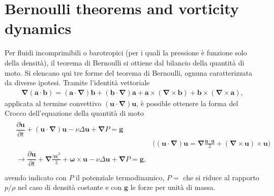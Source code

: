 \documentclass[letterpaper,10pt,italian]{jupyterBook}
\begin{document}
\chapter{Bernoulli theorems and vorticity dynamics}
\label{\detokenize{polimi/fluidmechanics-ita/template/capitoli/05_bernoulli/05teoria:bernoulli-theorems-and-vorticity-dynamics}}\label{\detokenize{polimi/fluidmechanics-ita/template/capitoli/05_bernoulli/05teoria:fluid-mechanics-bernoulli}}\label{\detokenize{polimi/fluidmechanics-ita/template/capitoli/05_bernoulli/05teoria::doc}}
\sphinxAtStartPar
Per fluidi incomprimibili o barotropici (per i quali la pressione è
funzione solo della densità), il teorema di Bernoulli si ottiene dal
bilancio della quantità di moto. Si elencano qui tre forme del teorema
di Bernoulli, ognuna caratterizzata da diverse ipotesi. Tramite
l’identità vettoriale
\begin{equation*}
\begin{split}\mathbf{\nabla} (\mathbf{a} \cdot \mathbf{b}) = (\mathbf{a} \cdot \mathbf{\nabla}) \mathbf{b} +  (\mathbf{b} \cdot \mathbf{\nabla}) \mathbf{a} + \mathbf{a} \times (\mathbf{\nabla} \times \mathbf{b}) + \mathbf{b} \times (\mathbf{\nabla} \times \mathbf{a}),\end{split}
\end{equation*}
\sphinxAtStartPar
applicata al termine convettivo \((\mathbf{u} \cdot \mathbf{\nabla}) \mathbf{u}\), è
possible ottenere la forma del Crocco dell’equazione della quantità di
moto
\begin{equation*}
\begin{split}\label{eqn:bilanci:crocco}
\begin{aligned}
 & \dfrac{\partial \mathbf{u}}{\partial t} + (\mathbf{u} \cdot \mathbf{\nabla}) \mathbf{u} - \nu \Delta \mathbf{u} + \mathbf{\nabla} P = \mathbf{g}  & \\ &  &  \bigg( (\mathbf{u} \cdot \mathbf{\nabla})\mathbf{u} = \mathbf{\nabla} \frac{\mathbf{u} \cdot \mathbf{u}}{2} + (\mathbf{\nabla} \times \mathbf{u}) \times \mathbf{u} \bigg) \\
 & \rightarrow \dfrac{\partial \mathbf{u}}{\partial t} + \mathbf{\nabla} \frac{|\mathbf{u}|^2}{2} + \mathbf{\omega} \times \mathbf{u} - \nu \Delta \mathbf{u} + \mathbf{\nabla} P = \mathbf{g} , & \\
\end{aligned}\end{split}
\end{equation*}
\sphinxAtStartPar
avendo indicato con \(P\) il potenziale termodinamico,
\(P =\) che si riduce al rapporto \(p/\rho\) nel caso di densità costante e
con \(\mathbf{g}\) le forze per unità di massa.
\end{document}
